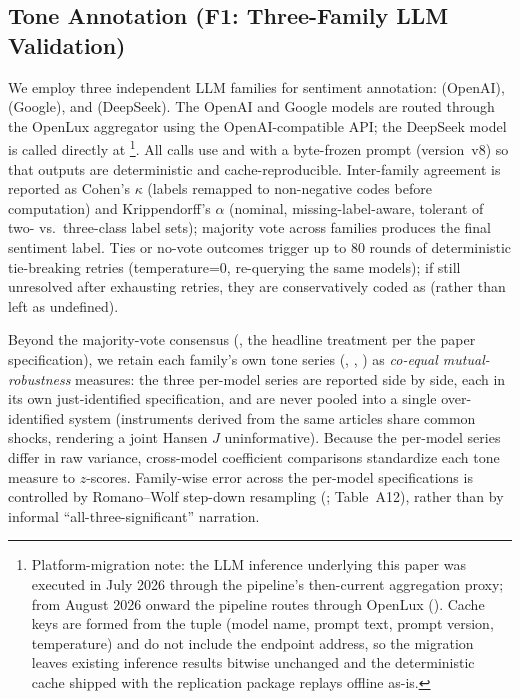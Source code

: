 \subsection{Tone Annotation (F1: Three-Family LLM Validation)}
We employ three independent LLM families for sentiment annotation:
 (OpenAI), 
(Google), and  (DeepSeek). The OpenAI and
Google models are routed through the OpenLux aggregator using the
OpenAI-compatible  API; the DeepSeek model
is called directly at \footnote{Platform-migration note: the LLM inference underlying this
paper was executed in July 2026 through the pipeline's then-current
aggregation proxy; from August 2026 onward the pipeline routes through
OpenLux (). Cache keys are formed from
the tuple (model name, prompt text, prompt version, temperature) and do
not include the endpoint address, so the migration leaves existing
inference results bitwise unchanged and the deterministic cache shipped
with the replication package replays offline as-is.}. All calls use
 and  with a byte-frozen prompt
(version~v8) so that outputs are deterministic and cache-reproducible.
Inter-family agreement is reported as Cohen's $\kappa$ (labels
remapped to non-negative codes before computation) and Krippendorff's
$\alpha$ (nominal, missing-label-aware, tolerant of two- vs.\
three-class label sets); majority vote across families produces the
final sentiment label. Ties or no-vote outcomes trigger up to 80
rounds of deterministic tie-breaking retries (temperature=0,
re-querying the same models); if still unresolved after exhausting
retries, they are conservatively coded as \code{neutral} (rather than
left as undefined).

Beyond the majority-vote consensus (, the
headline treatment per the paper specification), we retain each
family's own tone series
(, ,
) as \emph{co-equal mutual-robustness}
measures: the three per-model series are reported side by side, each
in its own just-identified specification, and are never pooled into a
single over-identified system (instruments derived from the same
articles share common shocks, rendering a joint Hansen $J$
uninformative). Because the per-model series differ in raw variance,
cross-model coefficient comparisons standardize each tone measure to
$z$-scores. Family-wise error across the per-model specifications is
controlled by Romano--Wolf step-down resampling
(; Table~A12), rather than by informal
``all-three-significant'' narration.

